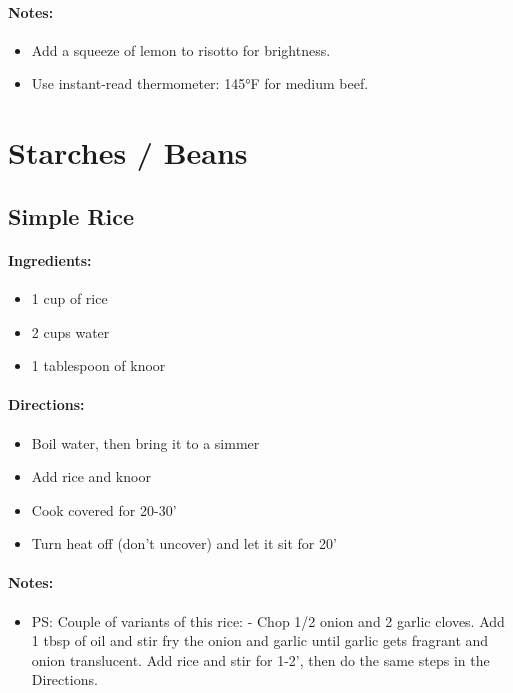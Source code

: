 \documentclass{article}
\begin{document}
\paragraph{Notes:}
\begin{itemize}
    \item Add a squeeze of lemon to risotto for brightness.
    \item Use instant-read thermometer: 145°F for medium beef.
\end{itemize}

\section{Starches / Beans}


\subsection{Simple Rice}

\paragraph{Ingredients:}
\begin{itemize}
    \item 1 cup of rice
    \item 2 cups water
    \item 1 tablespoon of knoor
\end{itemize}

\paragraph{Directions:}
\begin{itemize}
    \item Boil water, then bring it to a simmer
    \item Add rice and knoor
    \item Cook covered for 20-30'
    \item Turn heat off (don't uncover) and let it sit for 20'
\end{itemize}

\paragraph{Notes:}
\begin{itemize}
    \item PS: Couple of variants of this rice: - Chop 1/2 onion and 2 garlic cloves. Add 1 tbsp of oil and stir fry the onion and garlic until garlic gets fragrant and onion translucent. Add rice and stir for 1-2’, then do the same steps in the Directions.
\end{itemize}
\end{document}
